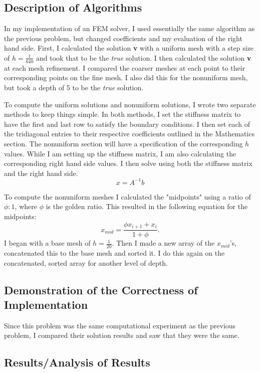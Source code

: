 \documentclass[11pt, oneside]{article}   	%
\begin{document}
\begin{enumerate}
\subsection{Description of Algorithms}

In my implementation of an FEM solver, I used essentially the same algorithm as the previous problem, but changed coefficients and my evaluation of the right hand side. First, I calculated the solution \textbf{v} with a uniform mesh with a step size of $h = \frac{1}{640}$ and took that to be the \emph{true} solution. I then calculated the solution \textbf{v} at each mesh refinement. I compared the coarser meshes at each point to their corresponding points on the fine mesh. I also did this for the nonuniform mesh, but took a depth of 5 to be the \emph{true} solution.

To compute the uniform solutions and nonuniform solutions, I wrote two separate methods to keep things simple. In both methods, I set the stiffness matrix to have the first and last row to satisfy the boundary conditions. I then set each of the tridiagonal entries to their respective coefficients outlined in the Mathematics section. The nonuniform section will have a specification of the corresponding $h$ values. While I am setting up the stiffness matrix, I am also calculating the corresponding right hand side values. I then solve using both the stiffness matrix and the right hand side. 
\[
x = A^{-1} b
\]

To compute the nonuniform meshes I calculated the "midpoints" using a ratio of $\phi:1$, where $\phi$ is the golden ratio. This resulted in the following equation for the midpoints:
\[
x_{mid} = \frac{\phi x_{i+1} + x_i}{1+\phi}.
\]
I began with a base mesh of $h = \frac{1}{20}$. Then I made a new array of the $x_{mid}$'s, concatenated this to the base mesh and sorted it. I do this again on the concatenated, sorted array for another level of depth.

\subsection{Demonstration of the Correctness of Implementation}

Since this problem was the same computational experiment as the previous problem, I compared their solution results and saw that they were the same.

\subsection{Results/Analysis of Results}


\end{enumerate}
\end{document}
